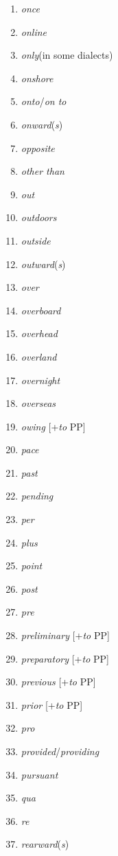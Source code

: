 \begin{multicols}{3}
\begin{enumerate}[noitemsep]
    \item \textit{once}
    \item \textit{online}
    \item \textit{only}\newline(in some dialects)
    \item \textit{onshore}
    \item \textit{onto}/\textit{on to}
    \item \textit{onward}(\textit{s})
    \item \textit{opposite}
    \item \textit{other than}
    \item \textit{out}
    \item \textit{outdoors}
    \item \textit{outside}
    \item \textit{outward}(\textit{s})
    \item \textit{over}
    \item \textit{overboard}
    \item \textit{overhead}
    \item \textit{overland}
    \item \textit{overnight}
    \item \textit{overseas}
    \item \textit{owing} [+\textit{to} PP]
    \item \textit{pace}
    \item \textit{past}
    \item \textit{pending}
    \item \textit{per}
    \item \textit{plus}
    \item \textit{point}
    \item \textit{post}
    \item \textit{pre}
    \item \textit{preliminary} [+\textit{to} PP]
    \item \textit{preparatory} [+\textit{to} PP]
    \item \textit{previous} [+\textit{to} PP]
    \item \textit{prior} [+\textit{to} PP]
    \item \textit{pro}
    \item \textit{provided}/\textit{providing}
    \item \textit{pursuant}
    \item \textit{qua}
    \item \textit{re}
    \item \textit{rearward}(\textit{s})

\end{enumerate}
\end{multicols}

